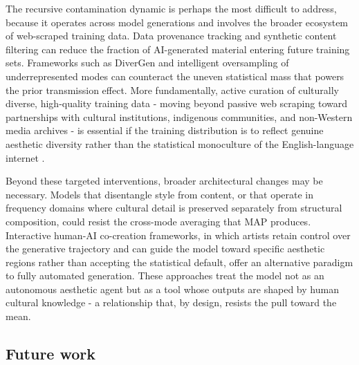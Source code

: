 \documentclass[11pt]{article}
\begin{document}
The recursive contamination dynamic is perhaps the most difficult to address, because it operates across model generations and involves the broader ecosystem of web-scraped training data. Data provenance tracking and synthetic content filtering can reduce the fraction of AI-generated material entering future training sets. Frameworks such as DiverGen \citep{Chang2024} and intelligent oversampling of underrepresented modes can counteract the uneven statistical mass that powers the prior transmission effect. More fundamentally, active curation of culturally diverse, high-quality training data - moving beyond passive web scraping toward partnerships with cultural institutions, indigenous communities, and non-Western media archives - is essential if the training distribution is to reflect genuine aesthetic diversity rather than the statistical monoculture of the English-language internet \citep{Chang2024, Bayramli2025}.

Beyond these targeted interventions, broader architectural changes may be necessary. Models that disentangle style from content, or that operate in frequency domains where cultural detail is preserved separately from structural composition, could resist the cross-mode averaging that MAP produces. Interactive human-AI co-creation frameworks, in which artists retain control over the generative trajectory and can guide the model toward specific aesthetic regions rather than accepting the statistical default, offer an alternative paradigm to fully automated generation. These approaches treat the model not as an autonomous aesthetic agent but as a tool whose outputs are shaped by human cultural knowledge - a relationship that, by design, resists the pull toward the mean.

\subsection{Future work}
\end{document}
